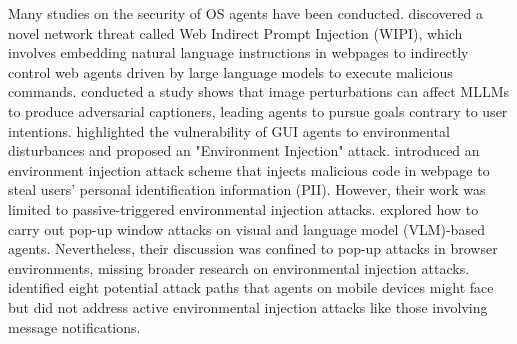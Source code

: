 Many studies on the security of OS agents have been conducted. 
\citet{wu2024wipinewwebthreat} discovered a novel network threat called Web Indirect Prompt Injection (WIPI), which involves embedding natural language instructions in webpages to indirectly control web agents driven by large language models to execute malicious commands. \citet{wu2024dissectingadversarialrobustnessmultimodal} conducted a study shows that image perturbations can affect MLLMs to produce adversarial captioners, leading agents to pursue goals contrary to user intentions. \citet{ma2024cautionenvironmentmultimodalagents} highlighted the vulnerability of GUI agents to environmental disturbances and proposed an "Environment Injection" attack. \citet{liao2024eiaenvironmentalinjectionattack} introduced an environment injection attack scheme that injects malicious code in webpage to steal users' personal identification information (PII). However, their work was limited to passive-triggered environmental injection attacks. \citet{zhang2024attackingvisionlanguagecomputeragents} explored how to carry out pop-up window attacks on visual and language model (VLM)-based agents. Nevertheless, their discussion was confined to pop-up attacks in browser environments, missing broader research on environmental injection attacks. 
\citet{yang2024securitymatrixmultimodalagents} identified eight potential attack paths that agents on mobile devices might face but did not address active environmental injection attacks like those involving message notifications.


